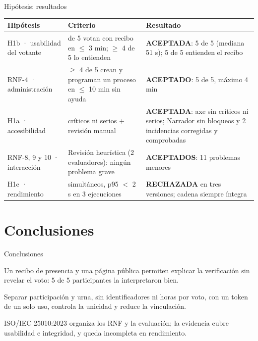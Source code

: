 \documentclass[aspectratio=169,11pt]{beamer}
\begin{document}
\begin{frame}{Hipótesis: resultados}
  \footnotesize
  \begin{tabular}{@{}>{\raggedright\arraybackslash}p{}>{\raggedright\arraybackslash}p{}>{\raggedright\arraybackslash}p{}@{}}
    \toprule
    \textbf{Hipótesis} & \textbf{Criterio} & \textbf{Resultado}\\
    \midrule
    H1b · usabilidad del votante & 5 de 5 votan con recibo en \(\le\) 3 min; \(\ge\) 4 de 5 lo entienden & \textcolor{acierto}{\textbf{ACEPTADA}}: 5 de 5 (mediana 51 s); 5 de 5 entienden el recibo\\\addlinespace
    RNF-4 · administración & \(\ge\) 4 de 5 crean y programan un proceso en \(\le\) 10 min sin ayuda & \textcolor{acierto}{\textbf{ACEPTADO}}: 5 de 5, máximo 4 min\\\addlinespace
    H1a · accesibilidad & 0 críticos ni serios + revisión manual & \textcolor{acierto}{\textbf{ACEPTADA}}: axe sin críticos ni serios; Narrador sin bloqueos y 2 incidencias corregidas y comprobadas\\\addlinespace
    RNF-8, 9 y 10 · interacción & Revisión heurística (2 evaluadores): ningún problema grave & \textcolor{acierto}{\textbf{ACEPTADOS}}: 11 problemas menores\\\addlinespace
    H1c · rendimiento & 500 simultáneos, p95 \(<\) 2 s en 3 ejecuciones & \textcolor{fallo}{\textbf{RECHAZADA}} en tres versiones; cadena siempre íntegra\\
    \bottomrule
  \end{tabular}
  \vspace{6pt}
\end{frame}

\section{Conclusiones}
\begin{frame}{Conclusiones}
  \begin{description}\small
    \item[RQ1] Un recibo de presencia y una página pública permiten explicar la verificación sin revelar el voto: 5 de 5 participantes la interpretaron bien.
    \item[RQ2] Separar participación y urna, sin identificadores ni horas por voto, con un token de un solo uso, controla la unicidad y reduce la vinculación.
    \item[RQ3] ISO/IEC 25010:2023 organiza los RNF y la evaluación; la evidencia cubre usabilidad e integridad, y queda incompleta en rendimiento.
  \end{description}
  \vspace{4pt}
\end{frame}
\end{document}
